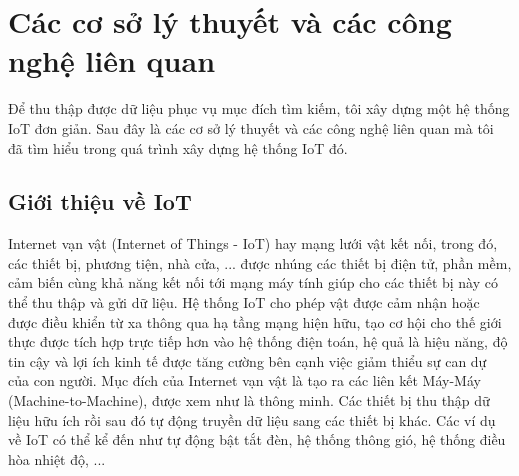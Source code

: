 \chapter{Các cơ sở lý thuyết và các công nghệ liên quan}

Để thu thập được dữ liệu phục vụ mục đích tìm kiếm, tôi xây dựng một hệ thống IoT đơn giản. Sau đây là các cơ sở lý thuyết và các công nghệ liên quan mà tôi đã tìm hiểu trong quá trình xây dựng hệ thống IoT đó.

\section{Giới thiệu về IoT}
Internet vạn vật (Internet of Things - IoT) hay mạng lưới vật kết nối, trong đó, các thiết bị, phương tiện, nhà cửa, ... được nhúng các thiết bị điện tử, phần mềm, cảm biến cùng khả năng kết nối tới mạng máy tính giúp cho các thiết bị này có thể thu thập và gửi dữ liệu. Hệ thống IoT cho phép vật được cảm nhận hoặc được điều khiển từ xa thông qua hạ tầng mạng hiện hữu, tạo cơ hội cho thế giới thực được tích hợp trực tiếp hơn vào hệ thống điện toán, hệ quả là hiệu năng, độ tin cậy và lợi ích kinh tế được tăng cường bên cạnh việc giảm thiểu sự can dự của con người. Mục đích của Internet vạn vật là tạo ra các liên kết Máy-Máy (Machine-to-Machine), được xem như là thông minh. Các thiết bị thu thập dữ liệu hữu ích rồi sau đó tự động truyền dữ liệu sang các thiết bị khác. Các ví dụ về IoT có thể kể đến như tự động bật tắt đèn, hệ thống thông gió, hệ thống điều hòa nhiệt độ, ... 



